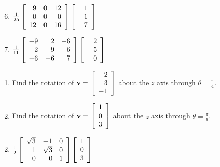 \begin{multicols}{2}
\begin{ex}
\begin{sol}
\begin{enumerate}[label={\alph*.}]
\setcounter{enumi}{5}
\item  
$\tfrac{1}{25}\left[
\begin{array}{rrr}
9 & 0 & 12\\
0 & 0 & 0\\
12 & 0 & 16
\end{array}
\right]
\left[
\begin{array}{r}
1\\
-1\\
7
\end{array}
\right]$

\setcounter{enumi}{7}
\item 
 $\tfrac{1}{11}\left[
\begin{array}{rrr}
-9 & 2 & -6\\
2 & -9 & -6\\
-6 & -6 & 7
\end{array}
\right]
\left[
\begin{array}{r}
2\\
-5\\
0
\end{array}
\right]$

\end{enumerate}
\end{sol}
\end{ex}

\begin{ex}
\begin{enumerate}[label={\alph*.}]
\item Find the rotation of 
$\textbf{v} = \left[
\begin{array}{r}
2\\
3\\
-1 
\end{array}
\right]$
 about the $z$ axis through $\theta = \frac{\pi}{4}$.

\item Find the rotation of 
$\textbf{v} = \left[
\begin{array}{r}
1\\
0\\
3 
\end{array}
\right]$
 about the $z$ axis through $\theta = \frac{\pi}{6}$.

\end{enumerate}
\begin{sol}
\begin{enumerate}[label={\alph*.}]
\setcounter{enumi}{1}
\item  
$\tfrac{1}{2}\left[
\begin{array}{rrr}
\sqrt{3} & -1 & 0\\
1 & \sqrt{3} & 0\\
0 & 0 & 1
\end{array}
\right]
\left[
\begin{array}{r}
1\\
0\\
3
\end{array}
\right]$


\end{enumerate}
\end{sol}
\end{ex}
\end{multicols}
